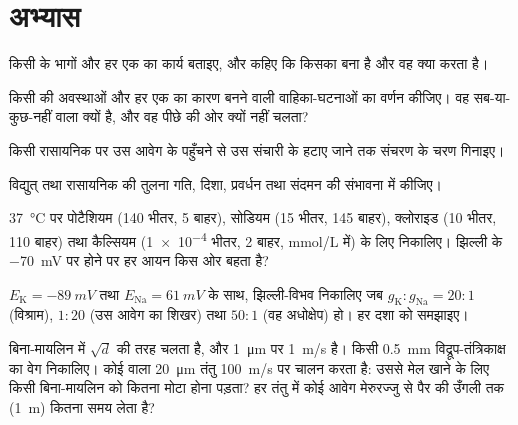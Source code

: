 \section{अभ्यास}

\begin{exercise}[$\star$]\label{exo:b2:neurons-synapses:1}
किसी  के भागों और हर एक का कार्य बताइए, और कहिए कि
 किसका बना है और वह क्या करता है।
\end{exercise}

\begin{exercise}[$\star$]\label{exo:b2:neurons-synapses:2}
किसी  की अवस्थाओं और हर एक का कारण बनने वाली वाहिका-घटनाओं का
वर्णन कीजिए। वह सब-या-कुछ-नहीं वाला क्यों है, और वह पीछे की ओर क्यों नहीं
चलता?
\end{exercise}

\begin{exercise}[$\star$]\label{exo:b2:neurons-synapses:3}
किसी रासायनिक  पर उस आवेग के पहुँचने से उस संचारी के हटाए जाने तक
संचरण के चरण गिनाइए।
\end{exercise}

\begin{exercise}[$\star$]\label{exo:b2:neurons-synapses:4}
विद्युत् तथा रासायनिक  की तुलना गति, दिशा,
प्रवर्धन तथा संदमन की संभावना में कीजिए।
\end{exercise}

\begin{exercise}[$\star\star$]\label{exo:b2:neurons-synapses:5}
\qty{37}{\celsius} पर पोटैशियम (140 भीतर, 5 बाहर), सोडियम (15 भीतर, 145 बाहर),
क्लोराइड (10 भीतर, 110 बाहर)
तथा कैल्सियम (\qty{1e-4}{} भीतर, 2 बाहर, \unit{mmol/L} में) के लिए  निकालिए। झिल्ली के
\qty{-70}{mV} पर होने पर हर आयन किस ओर बहता है?
\end{exercise}

\begin{exercise}[$\star\star$]\label{exo:b2:neurons-synapses:6}
$E_{\mathrm K} = \qty{-89}{mV}$ तथा $E_{\mathrm{Na}} =
\qty{+61}{mV}$ के साथ, झिल्ली-विभव निकालिए जब $g_{\mathrm K} :
g_{\mathrm{Na}} = 20 : 1$ (विश्राम), $1 : 20$ (उस आवेग का शिखर)
तथा $50 : 1$ (वह अधोक्षेप) हो। हर दशा को समझाइए।
\end{exercise}

\begin{exercise}[$\star\star$]\label{exo:b2:neurons-synapses:7}
बिना-मायलिन  में  $\sqrt d$ की तरह चलता है, और
\qty{1}{\micro m} पर \qty{1}{m/s} है। किसी \qty{0.5}{mm} विद्रूप-तंत्रिकाक्ष का
वेग निकालिए। कोई  वाला \qty{20}{\micro m} तंतु
\qty{100}{m/s} पर चालन करता है: उससे मेल खाने के लिए किसी बिना-मायलिन  को
कितना मोटा होना पड़ता? हर तंतु में कोई आवेग मेरुरज्जु से
पैर की उँगली तक (\qty{1}{m}) कितना समय लेता है?
\end{exercise}

